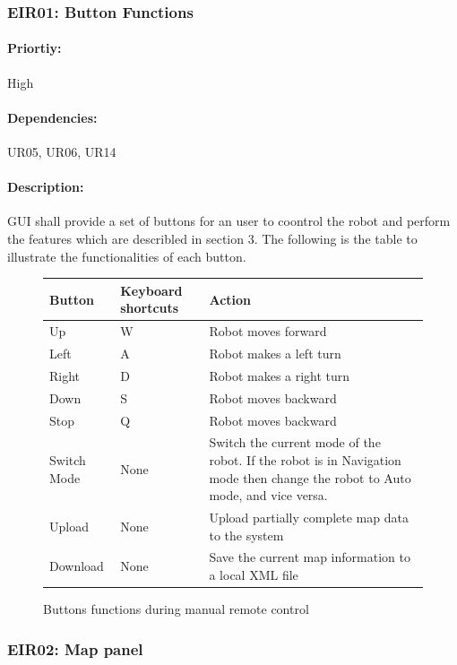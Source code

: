 \documentclass[10pt,a4paper,titlepage]{article}
\begin{document}
	\subsubsection*{EIR01: Button Functions}
	\paragraph{Priortiy:} High
	\paragraph{Dependencies:} UR05, UR06, UR14
	\paragraph{Description:} GUI shall provide a set of buttons for an user to coontrol the robot and perform the features which are describled in section 3. The following is the table to illustrate the functionalities of each button.

	\begin{figure}[H]
		\centering
		\begin{tabular}{|p{3cm}|p{3cm}| p{6cm}|}
			\hline 
			\textbf{Button} &\textbf{Keyboard shortcuts}& \textbf{Action} \\ \hline 
			Up & W &  Robot moves forward \\ \hline 
			Left & A& Robot makes a left turn \\ \hline 
			Right & D& Robot makes a right turn \\ \hline 
			Down & S&Robot moves backward \\ \hline 
			Stop & Q&Robot moves backward \\ \hline 
			Switch Mode &None& Switch the current mode of the robot. If the robot is in Navigation mode then change the robot to Auto mode, and vice versa. \\ \hline 
			Upload &None & Upload partially complete map data to the system \\ \hline
			Download &None & Save the current map information to a local XML file \\ \hline
		\end{tabular} 
		\caption{Buttons functions during manual remote control}
		\label{fig:button functions manual}
	\end{figure}

	\subsubsection*{EIR02: Map panel}
\end{document}
